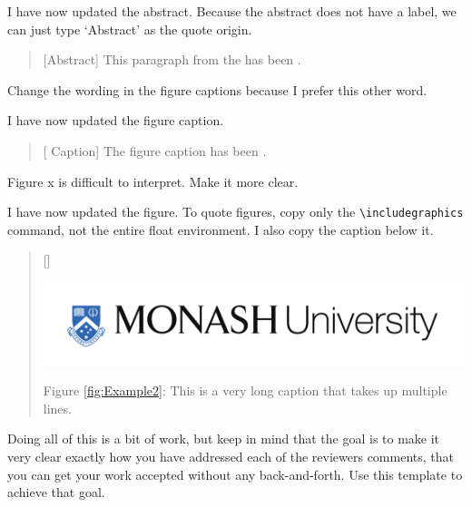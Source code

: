 \documentclass{AuthorResponse}
\begin{document}
I have now updated the abstract. Because the abstract does not have a label, we can just type `Abstract' as the quote origin.

\begin{quote}[Abstract]
	This paragraph from the   has been  .
\end{quote}


\RC Change the wording in the figure captions because I prefer this other word.

I have now updated the figure caption.

\begin{quote}[ Caption]
	The figure caption has been  .
\end{quote}


\RC Figure x is difficult to interpret. Make it more clear.

I have now updated the figure. To quote figures, copy only the \verb|\includegraphics| command, not the entire float environment. I also copy the caption below it.

\begin{quote}[]
	\centerline{\includegraphics[width=0.5\columnwidth,keepaspectratio]{Figures/monash-logo.pdf}}
	Figure \ref{fig:Example2}: This is a very long caption that takes up multiple lines.
\end{quote}

Doing all of this is a bit of work, but keep in mind that the goal is to make it very clear exactly how you have addressed each of the reviewers comments, that you can get your work accepted without any back-and-forth. Use this template to achieve that goal.


\end{document}
